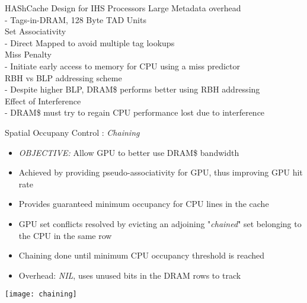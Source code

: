 \documentclass[final,t]{beamer}
\newcommand*\circled[1]{\tikz[baseline=(char.base)]{
            \node[shape=circle,draw,inner sep=2pt] (char) {#1};}}
\begin{document}
\begin{frame}[t,fragile]{}
\begin{columns}[t]
\begin{column}{.47\linewidth}
    \begin{exampleblock}{HAShCache Design for IHS Processors}
        \quad Large Metadata overhead \\
        	\quad \qquad- Tags-in-DRAM, 128 Byte TAD Units \\
        \quad Set Associativity \\
        	\quad \qquad- Direct Mapped to avoid multiple tag lookups \\
        \quad Miss Penalty \\
        	\quad \qquad- Initiate early access to memory for CPU using a miss predictor \\
        \quad RBH vs BLP addressing scheme \\
	        \quad \qquad- Despite higher BLP, DRAM\$ performs better using RBH addressing\\
        \quad Effect of Interference \\
        	\quad \qquad- DRAM\$ must try to regain CPU performance lost due to interference\\
    \end{exampleblock}
    
    \begin{exampleblock}{\circled{2} Spatial Occupany Control : \textit{Chaining}}
    \begin{itemize}
	    \item \emph{OBJECTIVE:} Allow GPU to better use DRAM\$ bandwidth
	    \item Achieved by providing pseudo-associativity for GPU, thus improving GPU hit rate
	    \item Provides guaranteed minimum occupancy for CPU lines in the cache
	    \item GPU set conflicts resolved by evicting an adjoining "\textit{chained}" set belonging to the CPU in the same row
	    \item Chaining done until minimum CPU occupancy threshold is reached
	    \item Overhead: \emph{NIL}, uses unused bits in the DRAM rows to track
    \end{itemize}
    \vspace{\baselineskip}
    \centering
    \texttt{[image: chaining]}
    \end{exampleblock}
    
       
\end{column}

\end{columns}

\end{frame}
\end{document}
